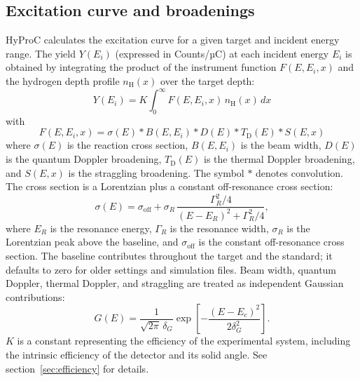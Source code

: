 \documentclass[11pt,a4paper]{article}
\begin{document}
\subsection{Excitation curve and broadenings}
HyProC calculates the excitation curve for a given target and incident energy range. The yield $Y(E_i)$ (expressed in Counts/µC) at each incident energy $E_i$ is obtained by integrating the product of the instrument function $F(E,E_i,x)$ and the hydrogen depth profile $n_\text{H}(x)$ over the target depth:
\begin{equation}
    Y(E_i) = K \int_{0}^{\infty} F(E,E_i,x) \, n_\text{H}(x)\, dx
    \label{eq:yield}
\end{equation}
with 
\begin{equation}
    F(E, E_i, x) =  \sigma(E) \ast B(E,E_i) \ast D(E) \ast T_\mathrm{D}(E) \ast S(E,x)
\end{equation}
where $\sigma(E)$ is the reaction cross section, $B(E,E_i)$ is the beam width, $D(E)$ is the quantum Doppler broadening, $T_\mathrm{D}(E)$ is the thermal Doppler broadening, and $S(E,x)$ is the straggling broadening. The symbol $\ast$ denotes convolution. The cross section is a Lorentzian plus a constant off-resonance cross section:
\begin{equation}
    \sigma(E) = \sigma_\text{off} +
    \sigma_R\,
    \frac{\Gamma_R^2/4}
    {(E-E_R)^2+\Gamma_R^2/4},
\end{equation}
where $E_R$ is the resonance energy, $\Gamma_R$ is the resonance width, $\sigma_R$ is the Lorentzian peak above the baseline, and $\sigma_\text{off}$ is the constant off-resonance cross section. The baseline contributes throughout the target and the standard; it defaults to zero for older settings and simulation files. Beam width, quantum Doppler, thermal Doppler, and straggling are treated as independent Gaussian contributions:
\begin{equation}
    G(E) =
    \frac{1}{\sqrt{2\pi}\,\delta_G}
    \exp\left[-\frac{(E-E_c)^2}{2\delta_G^2}\right].
\end{equation}
$K$ is a constant representing the efficiency of the experimental system, including the intrinsic efficiency of the detector and its solid angle. See section~\ref{sec:efficiency} for details.
\end{document}
